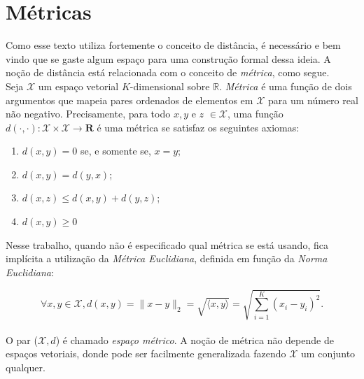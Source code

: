 \documentclass[a4paper,12pt]{article}
\begin{document}
\newpage
{}
{}




\appendix
\newpage
\section{Métricas}
\label{ap:metric}

Como esse texto utiliza fortemente o conceito de distância, é necessário e bem vindo que se gaste algum espaço para uma construção formal dessa ideia. A noção de distância está relacionada com o conceito de \textit{métrica}, como segue.
\\

Seja $\mathcal{X}$ um espaço vetorial $K$-dimensional sobre $\mathbb{R}$. \textit{Métrica} é uma função de dois argumentos que mapeia pares ordenados de elementos em $\mathcal{X}$ para um número real não negativo. Precisamente, para todo $x, y$ e $z$ $\in \mathcal{X}$, uma função $d(\cdot,\cdot): \mathcal{X} \times \mathcal{X} \longrightarrow \mathbf{R}$ é uma métrica se satisfaz os seguintes axiomas:

\begin{enumerate}
	\item $d(x,y) = 0$ se, e somente se, $x = y$; 
	\item $d(x,y) = d(y,x)$;
	\item $d(x,z) \leq d(x,y) + d(y,z)$;
	\item $d(x,y) \geq 0$
\end{enumerate}

Nesse trabalho, quando não é especificado qual métrica se está usando, fica implícita a utilização da \textit{Métrica Euclidiana}, definida em função da \textit{Norma Euclidiana}:

\begin{equation}\tag{Norma Euclidiana}
\forall x, y \in \mathcal{X}, d(x,y) = \lVert x-y \rVert_2 = \sqrt{\langle x, y\rangle} = \sqrt{\sum_{i = 1}^{K} (x_i-y_i)^2}.
\label{eq:normaEuclidiana}
\end{equation}
\\

O par ($\mathcal{X}, d$) é chamado \textit{espaço métrico}. A noção de métrica não depende de espaços vetoriais, donde pode ser facilmente generalizada fazendo $\mathcal{X}$ um conjunto qualquer.
\end{document}
